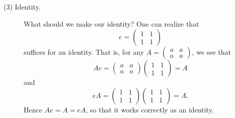 \documentclass[12pt,letterpaper]{algebra_book}
\theoremstyle{definition}
\begin{document}
\begin{description}
        \item[(3) Identity.] What should we make our identity? One can
        realize that 
        \[
            e= \begin{pmatrix}
                1 & 1\\
                1 & 1
            \end{pmatrix}
        \]
        suffices for an identity. That is, for any $A = 
        \begin{pmatrix}
            a & a\\
            a & a
        \end{pmatrix}$, we see that 
        \[
            Ae = 
            \begin{pmatrix}
                a & a\\
                a & a
            \end{pmatrix}
            \begin{pmatrix}
                1 & 1\\
                1 & 1
            \end{pmatrix}
            = A
        \]
        and 
        \[
            eA = 
            \begin{pmatrix}
                1 & 1\\
                1 & 1
            \end{pmatrix}
            \begin{pmatrix}
                1 & 1\\
                1 & 1
            \end{pmatrix}
            = A.
        \]
        Hence $Ae = A = eA$, so that it works correctly as an identity.


\end{description}
\end{document}
